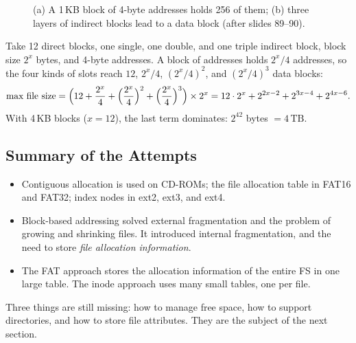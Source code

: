 \begin{figure}[H]
\centering
{}
\caption{(a) A 1\,KB block of 4-byte addresses holds 256 of them; (b) three layers of indirect blocks lead to a data block (after slides 89--90).}
\label{fig:addrblock}
\end{figure}

\begin{example}
  \label{ex:maxfile}
  Take 12 direct blocks, one single, one double, and one triple indirect block, block size $2^x$ bytes, and 4-byte addresses. A block of addresses holds $2^x / 4$ addresses, so the four kinds of slots reach $12$, $2^x/4$, $(2^x/4)^2$, and $(2^x/4)^3$ data blocks:
  \[
    \text{max file size} = \Bigl(12 + \frac{2^x}{4} + \Bigl(\frac{2^x}{4}\Bigr)^2 + \Bigl(\frac{2^x}{4}\Bigr)^3\Bigr) \times 2^x
    = 12 \cdot 2^x + 2^{2x-2} + 2^{3x-4} + 2^{4x-6}.
  \]
  With 4\,KB blocks ($x = 12$), the last term dominates: $2^{42}$ bytes $= 4\,\text{TB}$.
\end{example}

\subsection{Summary of the Attempts}

\begin{itemize}
  \item Contiguous allocation is used on CD-ROMs; the file allocation table in FAT16 and FAT32; index nodes in ext2, ext3, and ext4.
  \item Block-based addressing solved external fragmentation and the problem of growing and shrinking files. It introduced internal fragmentation, and the need to store \emph{file allocation information}.
  \item The FAT approach stores the allocation information of the entire FS in one large table. The inode approach uses many small tables, one per file.
\end{itemize}

Three things are still missing: how to manage free space, how to support directories, and how to store file attributes. They are the subject of the next section.
